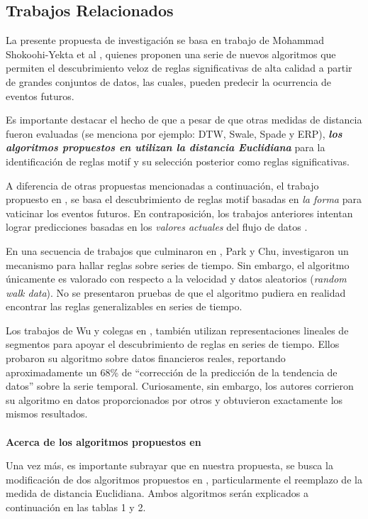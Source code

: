 \subsection{Trabajos Relacionados}
La presente propuesta de investigaci\'on se basa en trabajo de Mohammad Shokoohi-Yekta et al \cite{main}, quienes proponen una serie de nuevos algoritmos que permiten el des\-cubrimiento veloz de reglas significativas de alta calidad a partir de grandes conjuntos de datos, las cuales, pueden predecir la ocurrencia de eventos futuros.\par
Es importante destacar el hecho de que a pesar de que otras medidas de distancia fueron evaluadas (se menciona por ejemplo: DTW, Swale, Spade y ERP), \textit{\textbf{los algoritmos propuestos en \cite{main} utilizan la distancia Euclidiana}} para la identificaci\'on de reglas motif y su selecci\'on posterior como reglas significativas.\par
A diferencia de otras propuestas mencionadas a continuaci\'on, el trabajo propuesto en \cite{main}, se basa el descubrimiento de reglas motif basadas en \textit{la forma} para vaticinar los eventos futuros. En contraposici\'on, los trabajos anteriores intentan lograr predicciones basadas en los \textit{valores actuales} del flujo de datos \cite{others}.\par
En una secuencia de trabajos que culminaron en \cite{elasticrules}, Park y Chu, investigaron un mecanismo para hallar reglas sobre series de tiempo. Sin embargo, el algoritmo \'unicamente es valorado con respecto a la velocidad y datos aleatorios (\textit{random walk data}). No se presentaron pruebas de que el algoritmo pudiera en realidad encontrar las reglas generalizables en series de tiempo.\par
Los trabajos de Wu y colegas en \cite{eventdriven}, tambi\'en utilizan representaciones lineales de segmentos para apoyar el descubrimiento de reglas en series de tiempo. Ellos probaron su algoritmo sobre datos financieros reales, reportando aproximadamente un 68\% de \enquote{correcci\'on de la predicci\'on de la tendencia de datos} sobre la serie temporal. Curiosamente, sin embargo, los autores corrieron su algoritmo en datos proporcionados por otros y obtuvieron exactamente los mismos resultados.\\\\
\textbf{Acerca de los algoritmos propuestos en \cite{main}}\par
Una vez m\'as, es importante subrayar que en nuestra propuesta, se busca la modi\-ficaci\'on de dos algoritmos propuestos en \cite{main}, particularmente el reemplazo de la medida de distancia Euclidiana. Ambos algoritmos ser\'an explicados a continuaci\'on en las tablas 1 y 2.\par
